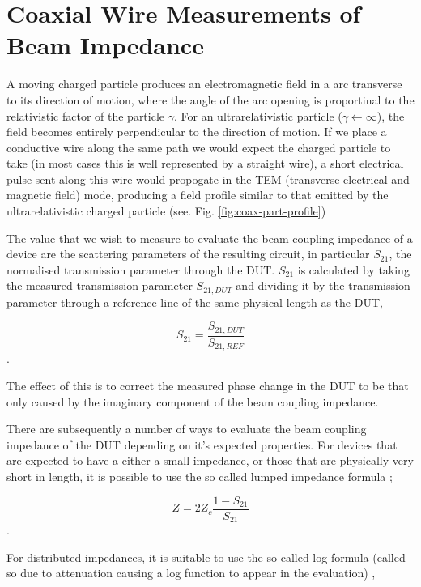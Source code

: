 \documentclass[review, number, sort&compress]{elsarticle}
\begin{document}
\section{Coaxial Wire Measurements of Beam Impedance}
\label{sec:coAxMeas}

A moving charged particle produces an electromagnetic field in a arc transverse to its direction of motion, where the angle of the arc opening is proportinal to the relativistic factor of the particle $\gamma$. For an ultrarelativistic particle ($\gamma \leftarrow \infty$), the field becomes entirely perpendicular to the direction of motion. If we place a conductive wire along the same path we would expect the charged particle to take (in most cases this is well represented by a straight wire), a short electrical pulse sent along this wire would propogate in the TEM (transverse electrical and magnetic field) mode, producing a field profile similar to that emitted by the ultrarelativistic charged particle (see. Fig. \ref{fig:coax-part-profile})

The value that we wish to measure to evaluate the beam coupling impedance of a device are the scattering parameters of the resulting circuit, in particular $S_{21}$, the normalised transmission parameter through the DUT. $S_{21}$ is calculated by taking the measured transmission parameter $S_{21,DUT}$ and dividing it by the transmission parameter through a reference line of the same physical length as the DUT,

\begin{equation}
S_{21} = \frac{S_{21,DUT}}{S_{21,REF}}
\end{equation}.

The effect of this is to correct the measured phase change in the DUT to be that only caused by the imaginary component of the beam coupling impedance.

There are subsequently a number of ways to evaluate the beam coupling impedance of the DUT depending on it's expected properties. For devices that are expected to have a either a small impedance, or those that are physically very short in length, it is possible to use the so called lumped impedance formula \cite{Hahn:BenchMeasInter, Hahn: ValidityImpMeas};

\begin{equation}
Z = 2Z_{c} \frac{1-S_{21}}{S_{21}}
\end{equation}.

For distributed impedances, it is suitable to use the so called log formula (called so due to attenuation causing a log function to appear in the evaluation) \cite{Hahn:BenchMeasInter, Hahn: ValidityImpMeas, Jensen:ImprovLogForm},
\end{document}

